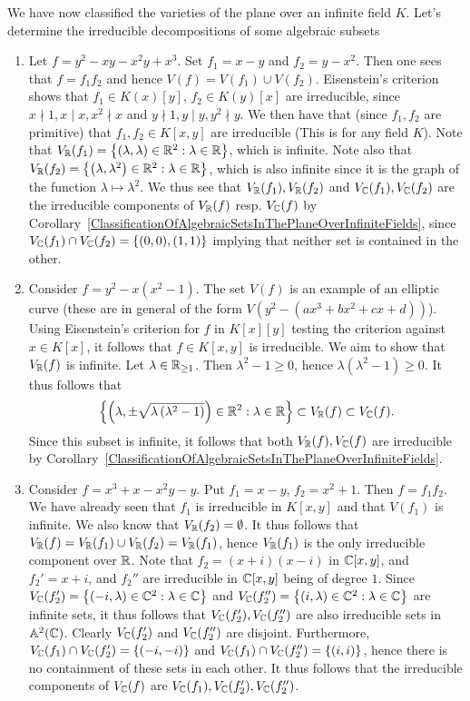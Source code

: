 \begin{example}
    We have now classified the varieties of the plane over an infinite field $K$. Let's determine the irreducible decompositions of some algebraic subsets
    \begin{enumerate}
        \item Let $f = y^2-xy-x^2y+x^3$. Set $f_1=x-y$ and $f_2 = y-x^2$. Then one sees that $f=f_1f_2$ and hence $V(f)=V(f_1)\cup V(f_2)$. Eisenstein's criterion shows that $f_1\in K(x)[y]$, $f_2\in K(y)[x]$ are irreducible, since $x\nmid 1, x\mid x, x^2\nmid x$ and $y\nmid 1, y\mid y, y^2\nmid y$. We then have that (since $f_1,f_2$ are primitive) that $f_1,f_2\in K[x,y]$ are irreducible (This is for any field $K$). Note that $V_{\mathbb{R}}(f_1) = \left\{(\lambda,\lambda)\in \mathbb{R}^2: \lambda \in \mathbb{R}\right\}$, which is infinite. Note also that $V_{\mathbb{R}}(f_2)= \left\{ \left(\lambda,\lambda^2\right)\in \mathbb{R}^2 : \lambda \in \mathbb{R}\right\}$, which is also infinite since it is the graph of the function $\lambda \mapsto \lambda^2$. We thus see that $V_{\mathbb{R}}(f_1),V_{\mathbb{R}}(f_2)$ and $V_{\mathbb{C}}(f_1),V_{\mathbb{C}}(f_2)$ are the irreducible components of $V_{\mathbb{R}}(f)$ resp. $V_{\mathbb{C}}(f)$ by Corollary~\ref{ClassificationOfAlgebraicSetsInThePlaneOverInfiniteFields}, since $V_{\mathbb{C}}(f_1)\cap V_{\mathbb{C}}(f_2) = \{(0,0),(1,1)\}$ implying that neither set is contained in the other.
        \item Consider $f= y^2-x\left(x^2-1\right)$. The set $V(f)$ is an example of an elliptic curve (these are in general of the form $V\left(y^2-\left(ax^3+bx^2+cx+d\right)\right)$). Using Eisenstein's criterion for $f$ in $K[x][y]$ testing the criterion against $x\in K[x]$, it follows that $f\in K[x,y]$ is irreducible. We aim to show that $V_{\mathbb{R}}(f)$ is infinite. Let $\lambda\in \mathbb{R}_{\geq 1}$. Then $\lambda^2-1\geq 0$, hence $\lambda\left(\lambda^2-1\right) \geq 0$. It thus follows that 
        $$\left\{ \left(\lambda,\pm \sqrt{\lambda\left(\lambda^2-1\right)} \right)\in \mathbb{R}^2 :\lambda \in \mathbb{R} \right\}\subset V_{\mathbb{R}}(f)\subset V_{\mathbb{C}}(f).$$
        Since this subset is infinite, it follows that both $V_{\mathbb{R}}(f),V_{\mathbb{C}}(f)$ are irreducible by Corollary~\ref{ClassificationOfAlgebraicSetsInThePlaneOverInfiniteFields}.
        \item Consider $f= x^3+x-x^2y-y$. Put $f_1= x-y$, $f_2=x^2+1$. Then $f= f_1f_2$. We have already seen that $f_1$ is irreducible in $K[x,y]$ and that $V(f_1)$ is infinite. We also know that $V_{\mathbb{R}}(f_2)=\emptyset$. It thus follows that $V_{\mathbb{R}}(f)=V_{\mathbb{R}}(f_1)\cup V_{\mathbb{R}}(f_2) = V_{\mathbb{R}}(f_1)$, hence $V_{\mathbb{R}}(f_1)$ is the only irreducible component over $\mathbb{R}$. Note that $f_2=(x+i)(x-i)$ in $\mathbb{C}[x,y]$, and $f_2'=x+i$, and $f_2''$ are irreducible in $\mathbb{C}[x,y]$ being of degree $1$. Since $V_{\mathbb{C}}(f_2')=\left\{(-i,\lambda)\in \mathbb{C}^2 : \lambda \in \mathbb{C}\right\}$ and $V_{\mathbb{C}}(f_2'')=\left\{(i,\lambda)\in \mathbb{C}^2 : \lambda \in \mathbb{C}\right\}$ are infinite sets, it thus follows that $V_{\mathbb{C}}(f_2'),V_{\mathbb{C}}(f_2'')$ are also irreducible sets in $\mathbb{A}^2(\mathbb{C})$. Clearly $V_{\mathbb{C}}(f_2')$ and $V_{\mathbb{C}}(f_2'')$ are disjoint. Furthermore, $V_{\mathbb{C}}(f_1)\cap V_{\mathbb{C}}(f_2') = \{(-i,-i)\}$ and $V_{\mathbb{C}}(f_1)\cap V_{\mathbb{C}}(f_2'') = \{(i,i)\}$, hence there is no containment of these sets in each other. It thus follows that the irreducible components of $V_{\mathbb{C}}(f)$ are $V_{\mathbb{C}}(f_1),V_{\mathbb{C}}(f_2'),V_{\mathbb{C}}(f_2'')$.
    \end{enumerate}
\end{example}
